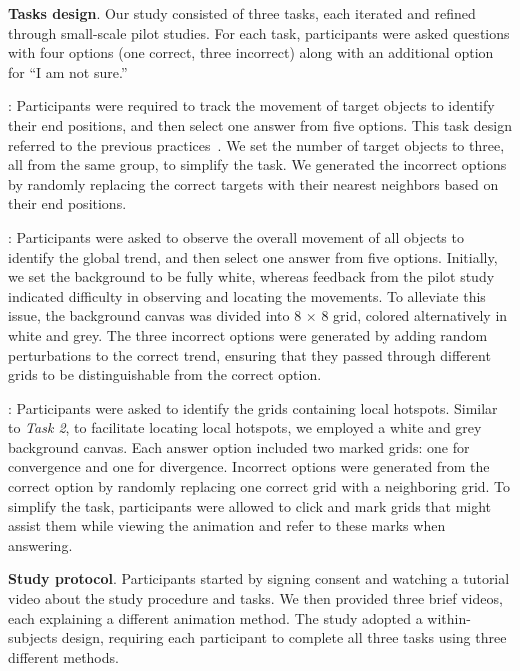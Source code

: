\noindent\textbf{Tasks design}.
Our study consisted of three tasks, each iterated and refined through small-scale pilot studies.
For each task, participants were asked questions with four options (one correct, three incorrect) along with an additional option for ``I am not sure.''

\track{}:
Participants were required to track the movement of target objects to identify their end positions, and then select one answer from five options.
This task design referred to the previous practices~\cite{du2015trajectory, wang2017vector}. 
We set the number of target objects to three, all from the same group, to simplify the task. 
We generated the incorrect options by randomly replacing the correct targets with their nearest neighbors based on their end positions.


\trend{}:
Participants were asked to observe the overall movement of all objects to identify the global trend, and then select one answer from five options.
Initially, we set the background to be fully white, whereas feedback from the pilot study indicated difficulty in observing and locating the movements. 
To alleviate this issue, the background canvas was divided into 8 $\times$ 8 grid, colored alternatively in white and grey. 
The three incorrect options were generated by adding random perturbations to the correct trend, ensuring that they passed through different grids to be distinguishable from the correct option. 



\hotspot{}:
Participants were asked to identify the grids containing local hotspots.
Similar to \textit{Task 2}, to facilitate locating local hotspots, we employed a white and grey background canvas.
Each answer option included two marked grids: one for convergence and one for divergence.
Incorrect options were generated from the correct option by randomly replacing one correct grid with a neighboring grid.
To simplify the task, participants were allowed to click and mark grids that might assist them while viewing the animation and refer to these marks when answering.



\noindent\textbf{Study protocol}.
Participants started by signing consent and watching a tutorial video about the study procedure and tasks. 
We then provided three brief videos, each explaining a different animation method.
The study adopted a within-subjects design, requiring each participant to complete all three tasks using three different methods.



